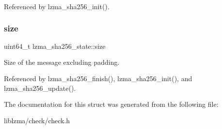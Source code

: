 Referenced by lzma\+\_\+sha256\+\_\+init().

\mbox{\label{structlzma__sha256__state_a62337a1a0d34a9702ab4a438da383794}} 
\subsubsection{size}
{\footnotesize\ttfamily uint64\+\_\+t lzma\+\_\+sha256\+\_\+state\+::size}



Size of the message excluding padding. 



Referenced by lzma\+\_\+sha256\+\_\+finish(), lzma\+\_\+sha256\+\_\+init(), and lzma\+\_\+sha256\+\_\+update().



The documentation for this struct was generated from the following file\+:\begin{DoxyCompactItemize}
\item 
liblzma/check/check.\+h\end{DoxyCompactItemize}
